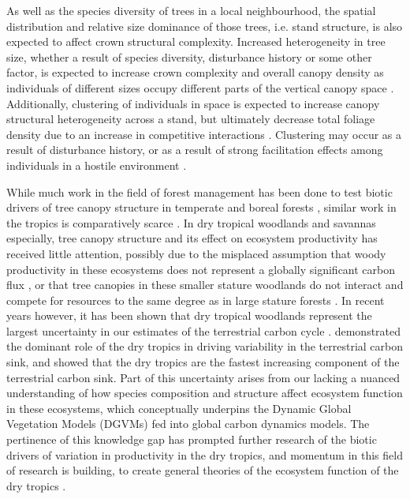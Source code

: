 \documentclass[11pt,a4paper]{article}
\begin{document}
As well as the species diversity of trees in a local neighbourhood, the spatial distribution and relative size dominance of those trees, i.e. stand structure, is also expected to affect crown structural complexity. Increased heterogeneity in tree size, whether a result of species diversity, disturbance history or some other factor, is expected to increase crown complexity and overall canopy density as individuals of different sizes occupy different parts of the vertical canopy space \citep{}. Additionally, clustering of individuals in space is expected to increase canopy structural heterogeneity across a stand, but ultimately decrease total foliage density due to an increase in competitive interactions \citep{}. Clustering may occur as a result of disturbance history, or as a result of strong facilitation effects among individuals in a hostile environment \citep{Ratcliffe2017}.

While much work in the field of forest management has been done to test biotic drivers of tree canopy structure in temperate \citep{} and boreal forests \citep{}, similar work in the tropics is comparatively scarce \citep{}. In dry tropical woodlands and savannas especially, tree canopy structure and its effect on ecosystem productivity has received little attention, possibly due to the misplaced assumption that woody productivity in these ecosystems does not represent a globally significant carbon flux \citep{}, or that tree canopies in these smaller stature woodlands do not interact and compete for resources to the same degree as in large stature forests \citep{}. In recent years however, it has been shown that dry tropical woodlands represent the largest uncertainty in our estimates of the terrestrial carbon cycle \citep{Quere2018, Ahlstrom2015}. \citet{Sitch2015} demonstrated the dominant role of the dry tropics in driving variability in the terrestrial carbon sink, and showed that the dry tropics are the fastest increasing component of the terrestrial carbon sink. Part of this uncertainty arises from our lacking a nuanced understanding of how species composition and structure affect ecosystem function in these ecosystems, which conceptually underpins the Dynamic Global Vegetation Models (DGVMs) fed into global carbon dynamics models. The pertinence of this knowledge gap has prompted further research of the biotic drivers of variation in productivity in the dry tropics, and momentum in this field of research is building, to create general theories of the ecosystem function of the dry tropics \citep{}.
\end{document}
